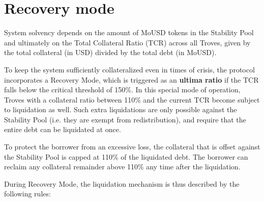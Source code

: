 \documentclass{article}
\begin{document}
\section{Recovery mode}
System solvency depends on the amount of MoUSD tokens in the Stability Pool and ultimately on the Total Collateral Ratio (TCR) across all Troves, given by the total collateral (in USD) divided by the total debt (in MoUSD). 

To keep the system sufficiently collateralized even in times of crisis, the protocol incorporates a Recovery Mode, which is triggered as an \textbf{ultima ratio} if the TCR falls below the critical threshold of 150\%. In this special mode of operation, Troves with a collateral ratio between 110\% and the current TCR become subject to liquidation as well. Such extra liquidations are only possible against the Stability Pool (i.e. they are exempt from redistribution), and require that the entire debt can be liquidated at once. 

To protect the borrower from an excessive loss, the collateral that is offset against the Stability Pool is capped at 110\% of the liquidated debt. The borrower can reclaim any collateral remainder above 110\% any time after the liquidation.

During Recovery Mode, the liquidation mechanism is thus described by the following rules:\\
\end{document}
